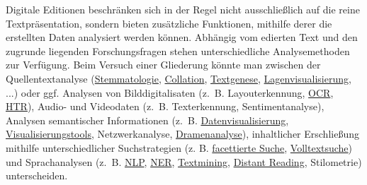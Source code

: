\documentclass{article}
\begin{document}
    Digitale Editionen beschränken sich in der Regel nicht ausschließlich auf die
                  reine Textpräsentation, sondern bieten zusätzliche Funktionen, mithilfe derer die
                  erstellten Daten analysiert werden können. Abhängig vom edierten Text und den
                  zugrunde liegenden Forschungsfragen stehen unterschiedliche Analysemethoden zur
                  Verfügung. Beim Versuch einer Gliederung könnte man zwischen der
                  Quellentextanalyse (\href{http://gams.uni-graz.at/o:konde.172}{Stemmatologie}, \href{http://gams.uni-graz.at/o:konde.105}{Collation},
                     \href{http://gams.uni-graz.at/o:konde.28}{Textgenese}, \href{http://gams.uni-graz.at/o:konde.113}{Lagenvisualisierung}, ...) oder ggf.
                  Analysen von Bilddigitalisaten (z. B. Layouterkennung, \href{http://gams.uni-graz.at/o:konde.149}{OCR}, \href{http://gams.uni-graz.at/o:konde.224}{HTR}), Audio- und Videodaten (z. B.
                  Texterkennung, Sentimentanalyse), Analysen semantischer Informationen (z. B. \href{http://gams.uni-graz.at/o:konde.54}{Datenvisualisierung}, \href{http://gams.uni-graz.at/o:konde.210}{Visualisierungstools},
                  Netzwerkanalyse, \href{http://gams.uni-graz.at/o:konde.74}{Dramenanalyse}),
                  inhaltlicher Erschließung mithilfe unterschiedlicher Suchstrategien (z. B. \href{http://gams.uni-graz.at/o:konde.82}{facettierte Suche}, \href{http://gams.uni-graz.at/o:konde.211}{Volltextsuche}) und Sprachanalysen
                  (z. B. \href{http://gams.uni-graz.at/o:konde.145}{NLP}, \href{http://gams.uni-graz.at/o:konde.141}{NER}, \href{http://gams.uni-graz.at/o:konde.194}{Textmining}, \href{http://gams.uni-graz.at/o:konde.71}{Distant
                     Reading}, Stilometrie) unterscheiden.\\
            
\end{document}
